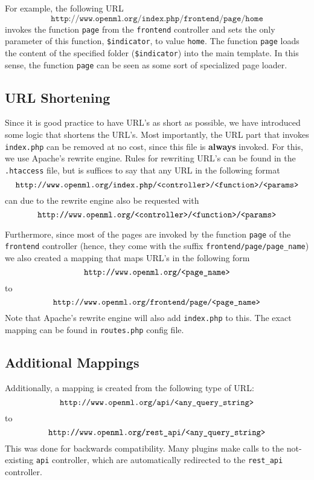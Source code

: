 \documentclass[10pt]{article}
\begin{document}
For example, the following URL
$$\texttt{http://www.openml.org/index.php/frontend/page/home}$$
invokes the function \texttt{page} from the \texttt{frontend} controller and sets the only parameter of this function, \texttt{\$indicator}, to value \texttt{home}. The function \texttt{page} loads the content of the specified folder (\texttt{\$indicator}) into the main template. In this sense, the function \texttt{page} can be seen as some sort of specialized page loader. 

\subsection{URL Shortening}
\label{sec:urlshortening}
Since it is good practice to have URL's as short as possible, we have introduced some logic that shortens the URL's. Most importantly, the URL part that invokes \texttt{index.php} can be removed at no cost, since this file is \textbf{always} invoked. For this, we use Apache's rewrite engine. Rules for rewriting URL's can be found in the \texttt{.htaccess} file, but is suffices to say that any URL in the following format
$$\texttt{http://www.openml.org/index.php/\textless controller\textgreater /\textless function\textgreater /\textless params\textgreater}$$
can due to the rewrite engine also be requested with
$$\texttt{http://www.openml.org/\textless controller\textgreater /\textless function\textgreater /\textless params\textgreater}$$

Furthermore, since most of the pages are invoked by the function \texttt{page} of the \texttt{frontend} controller (hence, they come with the suffix \texttt{frontend/page/page\_name}) we also created a mapping that maps URL's in the following form
$$\texttt{http://www.openml.org/\textless page\_name\textgreater}$$
to
$$\texttt{http://www.openml.org/frontend/page/\textless page\_name\textgreater}$$
Note that Apache's rewrite engine will also add \texttt{index.php} to this. The exact mapping can be found in \texttt{routes.php} config file.

\subsection{Additional Mappings}
Additionally, a mapping is created from the following type of URL:
$$\texttt{http://www.openml.org/api/\textless any\_query\_string\textgreater}$$
to 
$$\texttt{http://www.openml.org/rest\_api/\textless any\_query\_string\textgreater}$$
This was done for backwards compatibility. Many plugins make calls to the not-existing \texttt{api} controller, which are automatically redirected to the \texttt{rest\_api} controller. 
\end{document}
